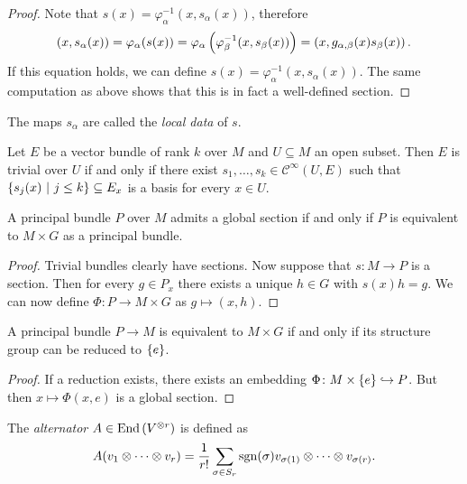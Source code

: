 \begin{proof}
Note that $s(x) = \varphi_\alpha^{-1}(x, s_\alpha(x))$, therefore
\[
\left(x, s_\alpha(x)\right) =
\varphi_\alpha(s(x)) =
\varphi_\alpha \left(\varphi_\beta^{-1}(x, s_\beta(x))\right) =
\left(x, g_{\alpha, \beta}(x) s_\beta(x)\right).
\]
If this equation holds, we can define
$s(x) = \varphi_\alpha^{-1}(x, s_\alpha(x))$. The same computation
as above shows that this is in fact a well-defined section.
\end{proof}

\begin{definicija}
The maps $s_\alpha$ are called the
\emph{local data} of $s$.
\end{definicija}

\begin{definicija}
Let $E$ be a vector bundle of rank $k$ over $M$ and $U \subseteq M$
an open subset. Then $E$ is trivial over $U$ if and only if there
exist $s_1, \dots, s_k \in \mathcal{C}^\infty(U, E)$ such that
$\left\{s_j(x)~\middle\vert~j \leq k\right\} \subseteq E_x$ is a basis for every
$x \in U$.
\end{definicija}

\obvs

\begin{trditev}
A principal bundle $P$ over $M$ admits a global section if and only
if $P$ is equivalent to $M \times G$ as a principal bundle.
\end{trditev}

\begin{proof}
Trivial bundles clearly have sections. Now suppose that
$s \colon M \to P$ is a section. Then for every $g \in P_x$ there
exists a unique $h \in G$ with $s(x) h = g$. We can now define
$\Phi \colon P \to M \times G$ as $g \mapsto (x, h)$.
\end{proof}

\begin{posledica}
A principal bundle $P \to M$ is equivalent to $M \times G$ if and
only if its structure group can be reduced to $\left\{e\right\}$.
\end{posledica}

\begin{proof}
If a reduction exists, there exists an embedding
$\Phi \colon M \times \left\{e\right\} \hookrightarrow P$. But then
$x \mapsto \Phi(x, e)$ is a global section.
\end{proof}


\begin{definicija}
The \emph{alternator}
$A \in \operatorname{End} \left(V^{\otimes r}\right)$ is defined as
\[
A(v_1 \otimes \dots \otimes v_r) =
\frac{1}{r!} \sum_{\sigma \in S_r} \operatorname{sgn}(\sigma)
v_{\sigma(1)} \otimes \dots \otimes v_{\sigma(r)}.
\]
\end{definicija}

